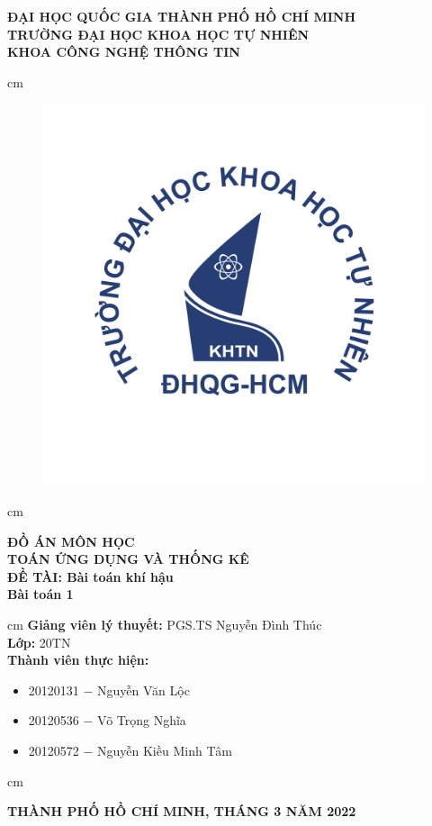 \documentclass[a4paper]{article}
\author{Nguyễn Văn Lộc}
\begin{document}
\begin{titlepage}
\begin{mybox}
\begin{center}
\fontsize{12}{12}\selectfont
\textbf{ĐẠI HỌC QUỐC GIA THÀNH PHỐ HỒ CHÍ MINH}\\
\textbf{TRƯỜNG ĐẠI HỌC KHOA HỌC TỰ NHIÊN}\\
\textbf{KHOA CÔNG NGHỆ THÔNG TIN}
\end{center}
 cm
\begin{figure}[H]
\begin{center}
\includegraphics[scale=0.25]{images/logo}
\end{center}
\end{figure}
 cm
\begin{center}
\fontsize{18}{14}\selectfont
\textbf{ĐỒ ÁN MÔN HỌC}\\
\fontsize{26}{16}\selectfont
\textbf{TOÁN ỨNG DỤNG VÀ THỐNG KÊ}\\
\fontsize{18}{12}\selectfont
\textbf{ĐỀ TÀI: Bài toán khí hậu}\\
\textbf{Bài toán 1}
\end{center}
 cm
\fontsize{14}{12}\selectfont
\textbf{Giảng viên lý thuyết:} PGS.TS Nguyễn Đình Thúc\\
\textbf{Lớp:} 20TN\\
\textbf{Thành viên thực hiện:}
\begin{itemize}
\item 20120131 $-$ Nguyễn Văn Lộc
\item 20120536 $-$ Võ Trọng Nghĩa
\item 20120572 $-$ Nguyễn Kiều Minh Tâm
\end{itemize}
 cm
\begin{center}
\textbf{THÀNH PHỐ HỒ CHÍ MINH, THÁNG 3 NĂM 2022}
\end{center}
\end{mybox}
\end{titlepage}
\end{document}

